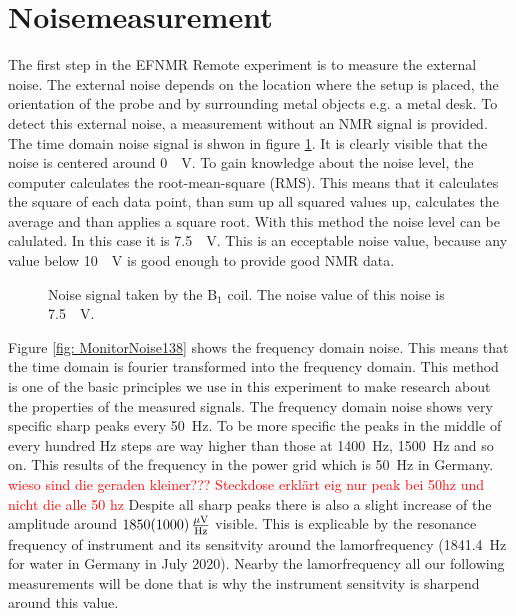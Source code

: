 \section{Noisemeasurement}
\label{sec:Noisemeasurement}
The first step in the EFNMR Remote experiment is to measure the external noise. The external noise depends on the location where the setup is placed, the orientation of the probe and by surrounding metal objects e.g. a metal desk. To detect this external noise, a measurement without an NMR signal is provided. The time domain noise signal is shwon in figure \ref{fig: noise}. It is clearly visible that the noise is centered around \SI{0}{\mu \volt}. To gain knowledge about the noise level, the computer calculates the root-mean-square (RMS). This means that it calculates the square of each data point, than sum up all squared values up, calculates the average and than applies a square root. With this method the noise level can be calulated. In this case it is \SI{7.5}{\mu \volt}. This is an ecceptable noise value, because any value below \SI{10}{\mu \volt} is good enough to provide good NMR data.

\begin{figure}[H]
    \centering
    
    \caption[Noise signal taken by the B$_1$ coil.]{Noise signal taken by the B$_1$ coil. The noise value of this noise is \SI{7.5}{\mu \volt}.}
    \label{fig: noise}
\end{figure}

Figure \ref{fig: MonitorNoise138} shows the frequency domain noise. This means that the time domain is fourier transformed into the frequency domain. This method is one of the basic principles we use in this experiment to make research about the properties of the measured signals. The frequency domain noise shows very specific sharp peaks every \SI{50}{\hertz}. To be more specific the peaks in the middle of every hundred \si{\hertz} steps are way higher than those at \SI{1400}{\hertz}, \SI{1500}{\hertz} and so on. This results of the frequency in the power grid which is \SI{50}{\hertz} in Germany.
\textcolor{red}{wieso sind die geraden kleiner??? Steckdose erklärt eig nur peak bei 50hz und nicht die alle 50 hz}
Despite all sharp peaks there is also a slight increase of the amplitude around $\SI{1850 \pm 1000}{\frac{\mu \volt}{\hertz}}$ visible. This is explicable by the resonance frequency of instrument and its sensitvity around the lamorfrequency (\SI{1841.4}{\hertz} for water in Germany in July 2020). Nearby the lamorfrequency all our following measurements will be done that is why the instrument sensitvity is sharpend around this value.

